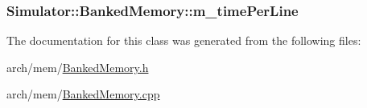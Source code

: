\hypertarget{class_simulator_1_1_banked_memory_a23e5b01a0d29de297c3137e51c1349c6}{
\subsubsection[{m\+\_\+time\+Per\+Line}]{ Simulator\+::\+Banked\+Memory\+::m\+\_\+time\+Per\+Line\hspace{0.3cm}{\ttfamily [protected]}}}\label{class_simulator_1_1_banked_memory_a23e5b01a0d29de297c3137e51c1349c6}


The documentation for this class was generated from the following files\+:\begin{DoxyCompactItemize}
\item 
arch/mem/\hyperlink{_banked_memory_8h}{Banked\+Memory.\+h}\item 
arch/mem/\hyperlink{_banked_memory_8cpp}{Banked\+Memory.\+cpp}\end{DoxyCompactItemize}
